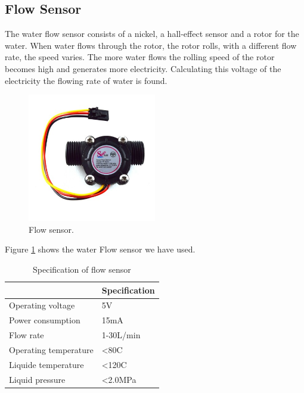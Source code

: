 \subsection{Flow Sensor}
The water flow sensor consists of a nickel, a hall-effect sensor and a rotor for the water. When water flows through the rotor, the rotor rolls, with a different flow rate, the speed varies. The more water flows the rolling speed of the rotor becomes high and generates more electricity. Calculating this voltage of the electricity the flowing rate of water is found.
\begin{figure}[h]
\centering
\includegraphics[width=0.5\textwidth]{figures/flow_sensor.jpg}
\caption{Flow sensor.}
\label{Flow1}
\end{figure}
Figure \ref{Flow1} shows the water Flow sensor we have used.

\begin{table}[h]
\centering
\caption{Specification of flow sensor}
\begin{tabular}{|l|l|}
\hline
\multicolumn{1}{|c|}{\cellcolor[HTML]{FFFFFF}{\color[HTML]{333333} \textbf{Characteristics}}} & \textbf{Specification} \\ \hline
Operating voltage                                                                       & 5V                     \\ \hline
Power consumption                                                                       & 15mA                   \\ \hline
Flow rate                                                                               & 1-30L/min              \\ \hline
Operating temperature                                                                   & \textless{}80C         \\ \hline
Liquide temperature                                                                     & \textless{}120C        \\ \hline
Liquid pressure                                                                         & \textless{}2.0MPa      \\ \hline
\end{tabular}
\end{table}

